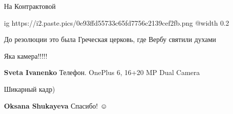  
 
 
 
 

На Контрактовой


\ifcmt
  ig https://i2.paste.pics/0e93ffd55733c65fd7756c2139cef2fb.png
  @width 0.2
\fi

До резолюции это была Греческая церковь, где Вербу святили духами

Яка камера!!!!!

\textbf{Sveta Ivanenko} Телефон.
OnePlus 6,
16+20 MP Dual Camera

Шикарный кадр)

\textbf{Oksana Shukayeva} Спасибо! ☺ ️ 
